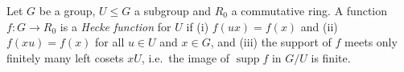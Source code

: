 Let $G$ be a group, $U\le G$ a subgroup and $R_0$ a commutative ring. A function $f\colon G\to R_0$ is a \emph{Hecke function} for $U$ if (i) $f(ux)=f(x)$ and (ii) $f(xu)=f(x)$ for all $u\in U$ and $x\in G$, and (iii) the support of $f$ meets only finitely many left cosets $xU$, i.e.\ the image of $\operatorname{supp}f$ in $G/U$ is finite.
